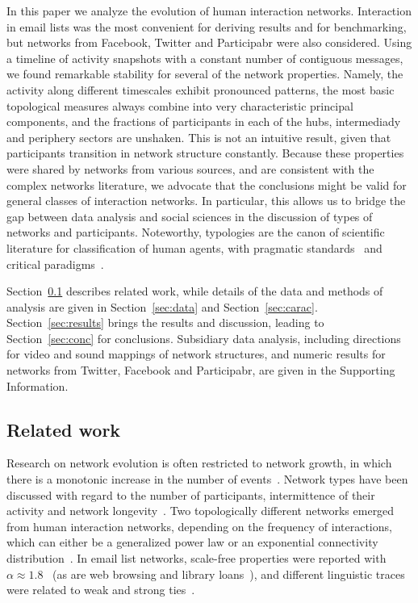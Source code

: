 \documentclass[%
	aip,
	jmp,%
	amsmath,amssymb,
	reprint,%
]{revtex4-1}
\begin{document}
In this paper we analyze the evolution of human interaction networks.
Interaction in email lists was the most convenient for deriving results and for benchmarking,
but networks from Facebook, Twitter and Participabr were also considered.
Using a timeline of activity snapshots with a constant number of contiguous messages,
we found remarkable stability for several of the network properties.
Namely, the activity along different timescales exhibit pronounced patterns,
the most basic topological measures always combine into very characteristic principal components,
and the fractions of participants in each of the hubs, intermediady and periphery sectors
are unshaken.
This is not an intuitive result, given that participants transition in network structure constantly.
Because these properties were shared by networks from various sources,
and are consistent with the complex networks literature,
we advocate that the conclusions might be valid for general classes of interaction networks.
In particular, this allows us to 
bridge the gap between data analysis 
and social sciences in the discussion
of types of networks and participants.
Noteworthy, typologies are the canon of scientific literature for classification of human agents,
with pragmatic standards~\cite{myers} and critical paradigms~\cite{adorno,typCanon}. 

Section~\ref{sec:related} describes related work,
while details of the data and methods of analysis are given in Section~\ref{sec:data} and Section~\ref{sec:carac}.
Section~\ref{sec:results} brings the results and discussion, leading to Section~\ref{sec:conc} for conclusions.
Subsidiary data analysis,
including directions for video and sound mappings of network structures,
and numeric results for networks from Twitter, Facebook and Participabr,
are given in the Supporting Information.


\subsection{Related work}\label{sec:related}
Research on network evolution is often restricted to network growth, in which there is a monotonic increase in the number of events~\cite{barabasiEvo}.
Network types have been discussed with regard to the number of participants, intermittence of their activity and network longevity~\cite{barabasiEvo}. Two topologically different networks emerged from human interaction networks, depending on the frequency of interactions, which can either be a generalized power law or an exponential connectivity distribution~\cite{barabasiTopologicalEv}. In email list networks, scale-free properties were reported with $\alpha \approx 1.8$~\cite{bird} (as are web browsing and library loans~\cite{barabasiHumanDyn}), and different linguistic traces were related to weak and strong ties~\cite{GMANE2}.
\end{document}
